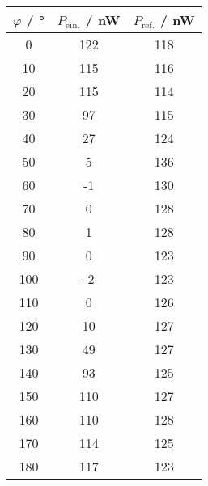 \begin{tabular}{S[table-format=3.0]S[table-format=3.0]S[table-format=3.0]}
\toprule
{$\varphi$ / \si{\degree}} & {$P_\mathrm{ein.}$ / \si{nW}} & {$P_\mathrm{ref.}$ / \si{nW}} \\
 &                           122 &                           118 \\
                        10 &                           115 &                           116 \\
                        20 &                           115 &                           114 \\
                        30 &                            97 &                           115 \\
                        40 &                            27 &                           124 \\
                        50 &                             5 &                           136 \\
                        60 &                            -1 &                           130 \\
                        70 &                             0 &                           128 \\
                        80 &                             1 &                           128 \\
                        90 &                             0 &                           123 \\
                       100 &                            -2 &                           123 \\
                       110 &                             0 &                           126 \\
                       120 &                            10 &                           127 \\
                       130 &                            49 &                           127 \\
                       140 &                            93 &                           125 \\
                       150 &                           110 &                           127 \\
                       160 &                           110 &                           128 \\
                       170 &                           114 &                           125 \\
                       180 &                           117 &                           123 \\
\bottomrule
\end{tabular}
